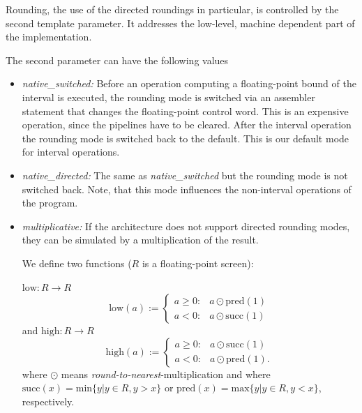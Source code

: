 \documentclass{report}
\begin{document}
Rounding, the use of the directed roundings in particular, is
controlled by the second template parameter. It
addresses the low-level, machine dependent part of the
implementation.

The second parameter can have the following values
\begin{itemize}

\item \textit{native\_switched:}
Before an operation computing a  floating-point bound of the interval 
is executed, the rounding mode is
switched via an 
assembler statement that changes the 
floating-point control word. This is an expensive operation, since the
pipelines have to be cleared. After the interval operation the
rounding mode is switched back to the default. This is our default mode for
interval operations.
\item \textit{native\_directed:}
The same as \textit{native\_switched} but the rounding mode is not
switched back. Note, that this mode influences the non-interval
operations of the program.
\item \textit{multiplicative:}
If the architecture does not support directed rounding modes, they can be
simulated by a multiplication of the result.

We define two functions ($R$ is a floating-point screen):

 $\mathrm{low} : R \rightarrow R$
\begin{equation}
\mathrm{low}(a):=\left\{
\begin{array}{ll}
a\ge 0: & a\odot \textrm{pred}(1) \\
a<0: & a\odot \textrm{succ}(1)
\end{array}
\right.
\label{low}
\end{equation}
and $\mathrm{high} : R \rightarrow R$ 
\begin{equation}
\mathrm{high}(a):=\left\{
\begin{array}{ll}
a\ge 0: & a\odot \textrm{succ}(1) \\
a<0: & a\odot \textrm{pred}(1).
\end{array}
\right.
\label{high}
\end{equation}
where $\odot$ means \emph{round-to-nearest}-multiplication and where
$\mathrm{succ}(x) = \mathrm{min}\{y|y \in R, y > x\}$ or 
$\mathrm{pred}(x) = \mathrm{max}\{y|y \in R, y <x\}$, respectively.




\end{itemize}
\end{document}
